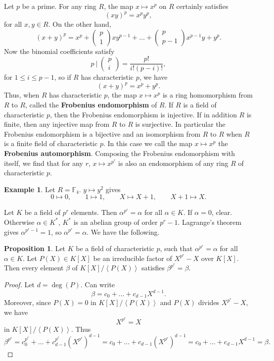 \documentclass{article}
\newcommand{\F}{\mathbb{F}}
\newcommand{\rb}[1]{\left( #1 \right)}
\renewcommand{\sb}[1]{\left[ #1 \right]}
\newcommand{\ab}[1]{\left\langle #1 \right\rangle}
\newcommand{\two}[2]{\begin{pmatrix} #1 \\ #2 \end{pmatrix}}
\theoremstyle{definition}\newtheorem{definition}{Definition}[subsection]
\theoremstyle{definition}\newtheorem{remark}[definition]{Remark}
\theoremstyle{definition}\newtheorem*{example}{Example}
\theoremstyle{definition}\newtheorem*{note}{Note}
\newtheorem{proposition}[definition]{Proposition}
\begin{document}
Let $ p $ be a prime. For any ring $ R $, the map $ x \mapsto x^p $ on $ R $ certainly satisfies
$$ \rb{xy}^p = x^py^p, $$
for all $ x, y \in R $. On the other hand,
$$ \rb{x + y}^p = x^p + \two{p}{1}xy^{p - 1} + \dots + \two{p}{p - 1}x^{p - 1}y + y^p. $$
Now the binomial coefficients satisfy
$$ p \ \Bigg| \ \two{p}{i} = \dfrac{p!}{i!\rb{p - i}!}, $$
for $ 1 \le i \le p - 1 $, so if $ R $ has characteristic $ p $, we have
$$ \rb{x + y}^p = x^p + y^p. $$
Thus, when $ R $ has characteristic $ p $, the map $ x \mapsto x^p $ is a ring homomorphism from $ R $ to $ R $, called the \textbf{Frobenius endomorphism} of $ R $. If $ R $ is a field of characteristic $ p $, then the Frobenius endomorphism is injective. If in addition $ R $ is finite, then any injective map from $ R $ to $ R $ is surjective. In particular the Frobenius endomorphism is a bijective and an isomorphism from $ R $ to $ R $ when $ R $ is a finite field of characteristic $ p $. In this case we call the map $ x \mapsto x^p $ the \textbf{Frobenius automorphism}. Composing the Frobenius endomorphism with itself, we find that for any $ r $, $ x \mapsto x^{p^r} $ is also an endomorphism of any ring $ R $ of characteristic $ p $.

\begin{example}
Let $ R = \F_4 $. $ y \mapsto y^2 $ gives
$$ 0 \mapsto 0, \qquad 1 \mapsto 1, \qquad X \mapsto X + 1, \qquad X + 1 \mapsto X. $$
\end{example}

Let $ K $ be a field of $ p^r $ elements. Then $ \alpha^{p^r} = \alpha $ for all $ \alpha \in K $. If $ \alpha = 0 $, clear. Otherwise $ \alpha \in K^* $, $ K^* $ is an abelian group of order $ p^r - 1 $. Lagrange's theorem gives $ \alpha^{p^r - 1} = 1 $, so $ \alpha^{p^r} = \alpha $. We have the following.

\begin{proposition}
Let $ K $ be a field of characteristic $ p $, such that $ \alpha^{p^r} = \alpha $ for all $ \alpha \in K $. Let $ P\rb{X} \in K\sb{X} $ be an irreducible factor of $ X^{p^r} - X $ over $ K\sb{X} $. Then every element $ \beta $ of $ K\sb{X} / \ab{P\rb{X}} $ satisfies $ \beta^{p^r} = \beta $.
\end{proposition}

\begin{proof}
Let $ d = \deg\rb{P} $. Can write
$$ \beta = c_0 + \dots + c_{d - 1}X^{d - 1}. $$
Moreover, since $ P\rb{X} = 0 $ in $ K\sb{X} / \ab{P\rb{X}} $ and $ P\rb{X} $ divides $ X^{p^r} - X $, we have
$$ X^{p^r} = X $$
in $ K\sb{X} / \ab{P\rb{X}} $. Thus
$$ \beta^{p^r} = c_0^{p^r} + \dots + c_{d - 1}^{p^r}\rb{X^{p^r}}^{d - 1} = c_0 + \dots + c_{d - 1}\rb{X^{p^r}}^{d - 1} = c_0 + \dots + c_{d - 1}X^{d - 1} = \beta. $$
\end{proof}
\end{document}
